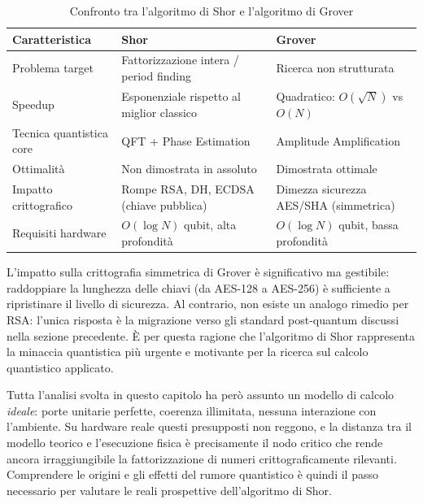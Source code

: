 \begin{table}[H]
\centering
\small
\begin{tabular}{@{}lp{5cm}p{5cm}@{}}
\toprule
\textbf{Caratteristica} & \textbf{Shor} & \textbf{Grover} \\
\midrule
Problema target          & Fattorizzazione intera / period finding & Ricerca non strutturata \\[2pt]
Speedup                  & Esponenziale rispetto al miglior classico & Quadratico: $O(\sqrt{N})$ vs $O(N)$ \\[2pt]
Tecnica quantistica core & QFT + Phase Estimation          & Amplitude Amplification \\[2pt]
Ottimalità               & Non dimostrata in assoluto      & Dimostrata ottimale \cite{bennett1997} \\[2pt]
Impatto crittografico    & Rompe RSA, DH, ECDSA (chiave pubblica) & Dimezza sicurezza AES/SHA (simmetrica) \\[2pt]
Requisiti hardware       & $O(\log N)$ qubit, alta profondità & $O(\log N)$ qubit, bassa profondità \\
\bottomrule
\end{tabular}
\caption{Confronto tra l'algoritmo di Shor e l'algoritmo di Grover}
\end{table}

L'impatto sulla crittografia simmetrica di Grover è significativo ma gestibile: raddoppiare la lunghezza delle chiavi (da AES-128 a AES-256) è sufficiente a ripristinare il livello di sicurezza. Al contrario, non esiste un analogo rimedio per RSA: l'unica risposta è la migrazione verso gli standard post-quantum discussi nella sezione precedente. È per questa ragione che l'algoritmo di Shor rappresenta la minaccia quantistica più urgente e motivante per la ricerca sul calcolo quantistico applicato.

Tutta l'analisi svolta in questo capitolo ha però assunto un modello di calcolo \textit{ideale}: porte unitarie perfette, coerenza illimitata, nessuna interazione con l'ambiente. Su hardware reale questi presupposti non reggono, e la distanza tra il modello teorico e l'esecuzione fisica è precisamente il nodo critico che rende ancora irraggiungibile la fattorizzazione di numeri crittograficamente rilevanti. Comprendere le origini e gli effetti del rumore quantistico è quindi il passo necessario per valutare le reali prospettive dell'algoritmo di Shor.
